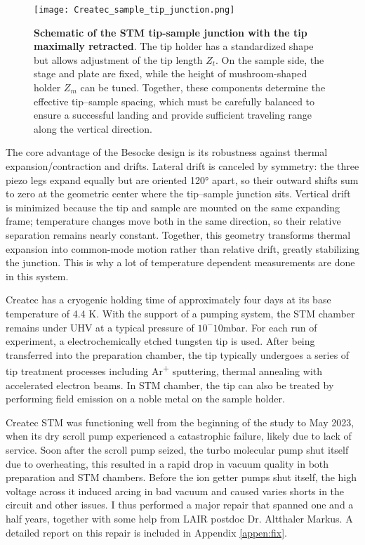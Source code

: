 \begin{figure}
	\centering
	\texttt{[image: Createc\_sample\_tip\_junction.png]}
	\caption[\textbf{Schematic of the STM tip-sample junction with the tip maximally retracted}]{\textbf{Schematic of the STM tip-sample junction with the tip maximally retracted}. The tip holder has a standardized shape but allows adjustment of the tip length $Z_t$. On the sample side, the stage and plate are fixed, while the height of mushroom-shaped holder $Z_m$ can be tuned. Together, these components determine the effective tip–sample spacing, which must be carefully balanced to ensure a successful landing and provide sufficient traveling range along the vertical direction.}
	\label{fig:Createc-tip-sample-junction}
\end{figure}

The core advantage of the Besocke design is its robustness against thermal expansion/contraction and drifts. Lateral drift is canceled by symmetry: the three piezo legs expand equally but are oriented 120° apart, so their outward shifts sum to zero at the geometric center where the tip–sample junction sits. Vertical drift is minimized because the tip and sample are mounted on the same expanding frame; temperature changes move both in the same direction, so their relative separation remains nearly constant. Together, this geometry transforms thermal expansion into common-mode motion rather than relative drift, greatly stabilizing the junction. This is why a lot of temperature dependent measurements are done in this system\cite{chiScanningTunnelingSpectroscopy2012}. 

Createc has a cryogenic holding time of approximately four days at its base temperature of 4.4 K. With the support of a pumping system, the STM chamber remains under UHV at a typical pressure of $10^-10$mbar. For each run of experiment, a electrochemically etched tungsten tip is used. After being transferred into the preparation chamber, the tip typically undergoes a series of tip treatment processes including Ar\textsuperscript{+} sputtering, thermal annealing with accelerated electron beams. In STM chamber, the tip can also be treated by performing field emission on a noble metal on the sample holder. 

Createc \ac{STM} was functioning well from the beginning of the study to May 2023, when its dry scroll pump experienced a catastrophic failure, likely due to lack of service. Soon after the scroll pump seized, the turbo molecular pump shut itself due to overheating, this resulted in a rapid drop in vacuum quality in both preparation and STM chambers. Before the ion getter pumps shut itself, the high voltage across it induced arcing in bad vacuum and caused varies shorts in the circuit and other issues. I thus performed a major repair that spanned one and a half years, together with some help from LAIR postdoc Dr. Altthaler Markus. A detailed report on this repair is included in Appendix \ref{appen:fix}. 
